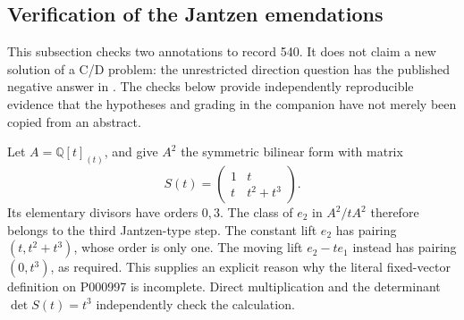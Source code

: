 \subsection{Verification of the Jantzen emendations}

This subsection checks two annotations to record 540. It does not claim a new solution of a C/D problem: the unrestricted direction question has the published negative answer in \citet[\S8.4]{williamson2016local}. The checks below provide independently reproducible evidence that the hypotheses and grading in the companion have not merely been copied from an abstract.

\begin{example}\ours
Let \(A=\mathbb Q[t]_{(t)}\), and give \(A^2\) the symmetric bilinear form with matrix
\[
 S(t)=\begin{pmatrix}1&t\\t&t^2+t^3\end{pmatrix}.
\]
Its elementary divisors have orders \(0,3\). The class of \(e_2\) in \(A^2/tA^2\) therefore belongs to the third Jantzen-type step. The constant lift \(e_2\) has pairing \((t,t^2+t^3)\), whose order is only one. The moving lift \(e_2-te_1\) instead has pairing \((0,t^3)\), as required. This supplies an explicit reason why the literal fixed-vector definition on P000997 is incomplete. Direct multiplication and the determinant \(\det S(t)=t^3\) independently check the calculation.
\end{example}

